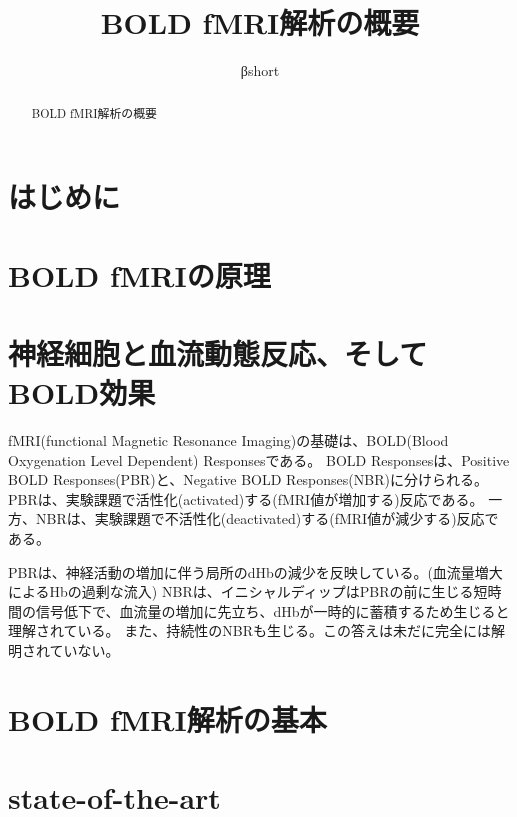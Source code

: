 \documentclass[uplatex, a4j]{jsarticle}
\title{BOLD fMRI解析の概要}
\author{βshort}
\begin{document}
\maketitle

\begin{abstract}
  BOLD fMRI解析の概要
\end{abstract}

\section{はじめに}


\section{BOLD fMRIの原理}


\section{神経細胞と血流動態反応、そしてBOLD効果}
fMRI(functional Magnetic Resonance Imaging)の基礎は、BOLD(Blood Oxygenation Level Dependent) Responsesである。
BOLD Responsesは、Positive BOLD Responses(PBR)と、Negative BOLD Responses(NBR)に分けられる。
PBRは、実験課題で活性化(activated)する(fMRI値が増加する)反応である。
一方、NBRは、実験課題で不活性化(deactivated)する(fMRI値が減少する)反応である。

PBRは、神経活動の増加に伴う局所のdHbの減少を反映している。(血流量増大によるHbの過剰な流入)
NBRは、イニシャルディップはPBRの前に生じる短時間の信号低下で、血流量の増加に先立ち、dHbが一時的に蓄積するため生じると理解されている。
また、持続性のNBRも生じる。この答えは未だに完全には解明されていない。

\section{BOLD fMRI解析の基本}

\section{state-of-the-art}
\end{document}
